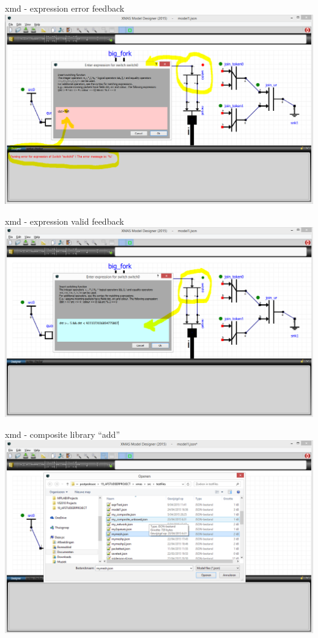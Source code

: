 \documentclass[11pt]{beamer}
\begin{document}
\begin{frame}{xmd - expression error feedback}
	\includegraphics[width=.90\linewidth]{pictures/2h-xmd-expressiondialog-error}
\end{frame}
\begin{frame}{xmd - expression valid feedback}
	\includegraphics[width=.90\linewidth]{pictures/2i-xmd-expressiondialog-valid}
\end{frame}
\begin{frame}{xmd - composite library ``add''}
	\includegraphics[width=.90\linewidth]{pictures/2j-xmd-compositelibrary-add}
\end{frame}
\end{document}
